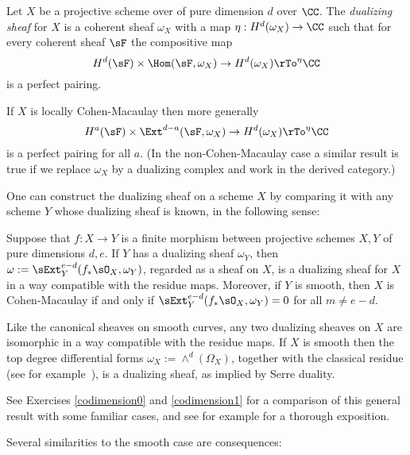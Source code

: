 \begin{definition}
Let $X$ be a projective scheme over of pure dimension $d$ over $\CC$. The \emph{dualizing sheaf} for $X$ is a coherent sheaf $\omega_X$ 
with a map $\eta: H^d(\omega_X) \to \CC$ such that for every coherent sheaf  $\sF$ the compositive map
$$
H^d(\sF) \times \Hom(\sF, \omega_X) \to H^d(\omega_X) \rTo^\eta \CC
$$
is a perfect pairing. 
\end{definition}

\begin{fact}
If $X$ is locally Cohen-Macaulay then more generally
$$
H^a(\sF) \times \Ext^{d-a}(\sF, \omega_X) \to H^d(\omega_X) \rTo^\eta \CC
$$
is a perfect pairing for all $a$. (In the non-Cohen-Macaulay case a similar result is true if we replace $\omega_X$ by a dualizing complex
and work in the derived category.) 
\end{fact}

One can construct the dualizing sheaf on a scheme
$X$ by comparing it with any scheme $Y$ whose dualizing sheaf is known, in the following sense:
\begin{fact} \label{construction of dualizing sheaf}\label{omega}\label{general adjunction}
Suppose that $f: X\to Y$ is a finite morphism between projective schemes $X,Y$ of pure dimensions $d,e$. If $Y$ has a dualizing sheaf $\omega_Y$,
then $\omega := \sExt_Y^{e-d}(f_*\sO_X,  \omega_Y)$, regarded as a sheaf on $X$, is a dualizing sheaf for $X$ in a way compatible with the residue maps.
Moreover, if $Y$ is smooth, then $X$ is Cohen-Macaulay if and only if $ \sExt_Y^{e-d}(f_*\sO_X,  \omega_Y)= 0$ for all $m\neq e-d$.
\end{fact}

Like the canonical sheaves on smooth curves, any two dualizing sheaves on  $X$ are isomorphic in a way compatible with the
residue maps. If $X$ is smooth then the top degree differential forms $\omega_X :=\wedge^d(\Omega_X)$,
together with the classical residue (see for example~\cite[p. 648, 708]{Griffiths-Harris1978}), is a dualizing sheaf, as implied by Serre duality. 

See Exercises \ref{codimension0} and \ref{codimension1} for a comparison of this general result with some
familiar cases, and see for example \cite{AltmanKleiman} for a thorough exposition.

Several similarities to the smooth case are consequences:

